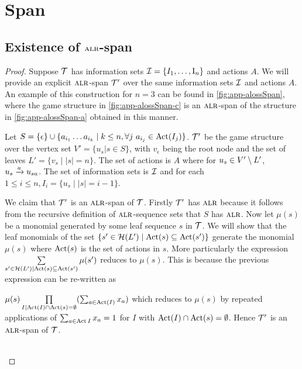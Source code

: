 \section{Span}

\subsection{Existence of $\textsc{alr}$-span}


\alrspan*

\begin{proof} Suppose $\mathcal{T}$ has information sets $\mathcal{I} = \{ I_1, \dots, \operatorname{I}_n \}$ and actions $A$. We will provide an explicit $\textsc{alr}$-span  $\mathcal{T}'$ over the same information sets $\mathcal{I}$ and actions $A$.
An example of this construction for $n=3$ can be found in \cref{fig:app-alossSpan}, where the game structure in \cref{fig:app-alossSpan-c} is an $\textsc{alr}$-span of the structure in \cref{fig:app-alossSpan-a} obtained in this manner. 
 
Let $S = \{\epsilon\} \cup  \{a_{i_1}\dots a_{i_k} \mid k \leq n, \forall j~ a_{i_j} \in \operatorname{Act}(I_j) \}$. $\mathcal{T}'$ be the game structure over the vertex set $V' = \{u_s | s \in S\}$, with $v_{\epsilon}$ being the root node and the set of leaves $L' = \{ v_s \mid \lvert s \rvert = n \}$. 
The set of actions is $A$ where for $u_s \in V'\setminus L'$, $u_s \xrightarrow{a} u_{sa}$. The set of information sets is $\mathcal{I}$ and for each $ 1 \leq i \leq n, I_i = \{ u_s \mid  \lvert s \rvert = i-1\}$.

We claim that $\mathcal{T}'$ is an $\textsc{alr}$-span of $\mathcal{T}$. Firstly $\mathcal{T}'$ has $\textsc{alr}$ because it follows from the recursive definition of $\textsc{alr}$-sequence sets that $S$ has $\textsc{alr}$.
Now let $\mu(s)$ be a monomial generated by some leaf sequence $s$ in $\mathcal{T}$. We will show that the leaf monomials of the set $\{ s' \in \mathcal{H}(L') \mid \operatorname{Act}(s) \subseteq \operatorname{Act}(s') \}$ generate the monomial $\mu(s)$ where $\operatorname{Act}(s)$ is the set of actions in $s$. More particularly the expression $\sum\limits_{s' \in \mathcal{H}(L') \mid \operatorname{Act}(s) \subseteq \operatorname{Act}(s')} \mu(s')$ reduces to $\mu(s)$. This is because the previous expression can be re-written as

 $\mu(s)\prod\limits_{I \mid \operatorname{Act}(I) \cap \operatorname{Act}(s) = \emptyset}(\sum_{a \in \operatorname{Act}(I)} x_a)$ which reduces to $\mu(s)$ by repeated applications of $\sum_{a \in \operatorname{Act}{I}}x_a = 1$ for $I$ with $ \operatorname{Act}(I) \cap \operatorname{Act}(s) = \emptyset$. Hence $\mathcal{T}'$ is an $\textsc{alr}$-span of $\mathcal{T}$.


~\\ 
\end{proof}

